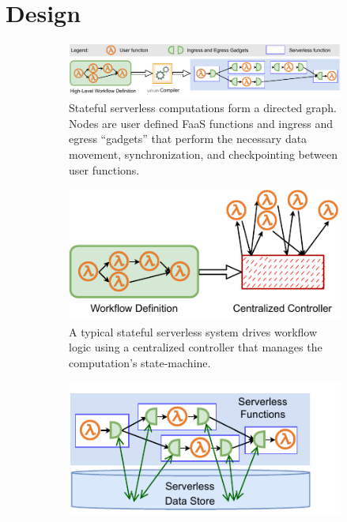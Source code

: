\section{Design}

\begin{figure}[t]
	\centering
	\begin{subfigure}[t]{0.8\textwidth}
		       \includegraphics[width=\columnwidth]{figures/unum-arch-compile-time.pdf}
		\caption{Stateful serverless computations form a directed graph. Nodes
			are user defined FaaS functions and ingress and egress ``gadgets'' that perform the necessary data movement, synchronization, and checkpointing between user functions.}
		\label{fig:arch:unum-compile-time}
	\end{subfigure}
	\begin{subfigure}[b]{\columnwidth}
		\centering
		\includegraphics[width=0.8\columnwidth]{figures/unum-arch-centralized.pdf}
		\caption{A typical stateful serverless system drives workflow logic
			using a centralized controller that manages the computation's state-machine.}
		\label{fig:arch:centralized}
	\end{subfigure}
	\hfill
	\begin{subfigure}[b]{\columnwidth}
		\centering
		\includegraphics[width=.7\columnwidth]{figures/unum-arch-runtime.pdf}

\end{subfigure}
\end{figure}
